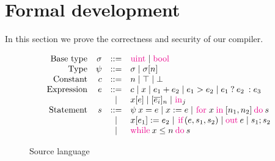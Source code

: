 \newcommand{\kw}[1]{{\lstinline[basicstyle=\small\color{magenta}]{#1}}}
\newcommand{\ftext}[1]{\text{\small{#1}}}
\newcommand{\cond}[3]{\ensuremath{{{#1}\:?\:{#2}\::{#3}}}}
\newcommand{\for}[4]{\ensuremath{\kw{for}\:{#1}\:\kw{in}\:[{#2}, {#3}]\:\kw{do}\:{#4}}}
\newcommand{\ite}[3]{\ensuremath{\kw{if}({#1}, {#2}, {#3})}}
\newcommand{\loops}[3]{\ensuremath{\kw{while}\:{#1} \leq {#2}\:\kw{do}\:{#3}}}

\section{Formal development}
\label{sec:ld}

In this section we prove the correctness and security of our compiler.

\begin{theorem}
  
\end{theorem}

\begin{figure}
  \small
  \[
  \begin{array}{rrcl}
    \ftext{Base type} & \sigma &::=& \kw{uint} \mid \kw{bool}\\
    \ftext{Type} & \psi &::=& \sigma \mid \sigma[n]\\
    \ftext{Constant} & c &::=& n \mid \top \mid \bot\\
    \ftext{Expression} & e &::=& c \mid x \mid e_{1} + e_{2} \mid e_{1} > e_{2} \mid \cond{e_{1}}{e_{2}}{e_{3}}\\
    & &\mid& x[e] \mid [\overline{e_{i}}]_{n} \mid \kw{in}_{j}\\
    \ftext{Statement} & s &::=& \psi\:x = e \mid x := e \mid \for{x}{n_{1}}{n_{2}}{s}\\
    & & \mid& x[e_{1}] := e_{2} \mid \ite{e}{s_{1}}{s_{2}} \mid \kw{out}\:e \mid s_{1}; s_{2}\\
    & & \mid& \loops{x}{n}{s}
  \end{array}
  \]
\label{fig:srclang}
\caption{Source language}
\end{figure}

